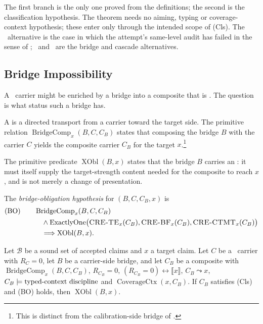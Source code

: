 The first branch is the only one proved from the definitions; the
second is the classification hypothesis.  The theorem needs no aiming,
typing or coverage-context hypothesis; these enter only through the
intended scope of (Cls).  The \CRETE\ alternative is
the case in which the attempt's same-level audit has failed in the
sense of ; \CREBF\ and \CRECTMT\ are the
bridge and cascade alternatives.

\subsection{Bridge Impossibility}\label{sec:foreclosure:bridge-impossibility}

A \nonXequiv\ carrier might be enriched by a bridge into a composite
that is \Xequiv.  The question is what status such a bridge has.

\begin{definition}\label{def:carrier-side-typed-bridge}
A \emph{\TypedBridgeCarrier} is a directed transport from a carrier
toward the target side.  The primitive relation
\(\operatorname{BridgeComp}_{x}(B,C,C_{B})\) states that composing the
bridge \(B\) with the carrier \(C\) yields the composite carrier
\(C_{B}\) for the target \(x\).\footnote{This is distinct from the
calibration-side bridge of .}
\end{definition}

\begin{definition}\label{def:x-strength-obligation}
The primitive predicate \(\operatorname{XObl}(B,x)\) states that the
bridge \(B\) carries an \emph{\XstrengthObl}: it must itself supply the
target-strength content needed for the composite to reach \(x\), and is
not merely a change of presentation.
\end{definition}

The \emph{bridge-obligation hypothesis} for \((B,C,C_{B},x)\) is
\[
\begin{aligned}
  \mbox{(BO)}\qquad
    &\operatorname{BridgeComp}_{x}(B,C,C_{B})\\
  &\quad\wedge\operatorname{ExactlyOne}\bigl(\mbox{\textup{\textsc{CRE-TE}}}_{x}(C_{B}),\mbox{\textup{\textsc{CRE-BF}}}_{x}(C_{B}),\mbox{\textup{\textsc{CRE-CTMT}}}_{x}(C_{B})\bigr)\\
  &\quad\Longrightarrow\operatorname{XObl}(B,x).
\end{aligned}
\]

\begin{corollary}\label{cor:bridge-impossibility}
Let \(\mathcal B\) be a sound set of accepted claims and \(x\) a target
claim.  Let \(C\) be a \nonXequiv\ carrier with \(R_{C}=0\), let \(B\) be
a carrier-side bridge, and let \(C_{B}\) be a composite with
\(\operatorname{BridgeComp}_{x}(B,C,C_{B})\), \(R_{C_{B}}=0\),
\((R_{C_{B}}=0)\leftrightarrow\llbracket x\rrbracket\),
\(C_{B}\leadsto x\), \(C_{B}\models\text{typed-context discipline}\) and
\(\operatorname{CoverageCtx}(x,C_{B})\).  If \(C_{B}\) satisfies
\textup{(Cls)} and \textup{(BO)} holds, then \(\operatorname{XObl}(B,x)\).
\end{corollary}

